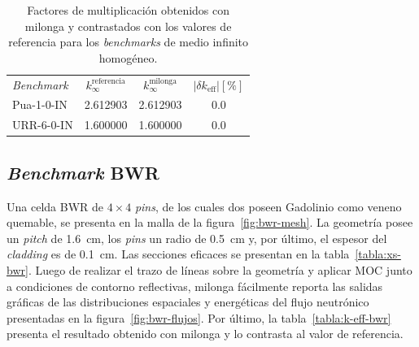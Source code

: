 \documentclass[11pt]{article}
\numberwithin{equation}{section}
\begin{document}
{
\begin{table}[ht!]
\begin{center}
\begin{tabular}{lccc}
\small \emph{Benchmark}  & \small $k_{\infty}^{\text{referencia}}$  & \small $k_{\infty}^{\text{milonga}}$  & \small $ \left| \delta  k_{\text{eff}} \right| \left[ \si{\percent} \right] $ \\
\small Pua-1-0-IN        & \tiny \num{2.612903}                     & \tiny \num{2.612903}                  & \tiny \num{0.0}     \\
\small URR-6-0-IN        & \tiny \num{1.600000}                     & \tiny \num{1.600000}                  & \tiny \num{0.0} 
\end{tabular}
\caption{\label{tabla:k-infty} Factores de multiplicación obtenidos con milonga y contrastados con los valores de referencia para los \emph{benchmarks} de medio infinito homogéneo.}
\end{center}
\end{table}
}


\subsection{\emph{Benchmark} BWR}

Una celda BWR de $\num{4} \times \num{4}$ \emph{pins}, de los cuales dos poseen Gadolinio como veneno quemable, se presenta en la malla de la figura~\ref{fig:bwr-mesh}. La geometr\'ia posee un \emph{pitch} de \SI{1.6}{\centi\metre}, los \emph{pins} un radio de \SI{0.5}{\centi\metre} y, por \'ultimo, el espesor del \emph{cladding} es de \SI{0.1}{\centi\metre}. Las secciones eficaces se presentan en la tabla~\ref{tabla:xs-bwr}. Luego de realizar el trazo de l\'ineas sobre la geometr\'ia y aplicar MOC junto a condiciones de contorno reflectivas, milonga f\'acilmente reporta las salidas gr\'aficas de las distribuciones espaciales y energ\'eticas del flujo neutrónico presentadas en la figura~\ref{fig:bwr-flujos}. Por \'ultimo, la tabla~\ref{tabla:k-eff-bwr} presenta el resultado obtenido con milonga y lo contrasta al valor de referencia.
 
\end{document}

